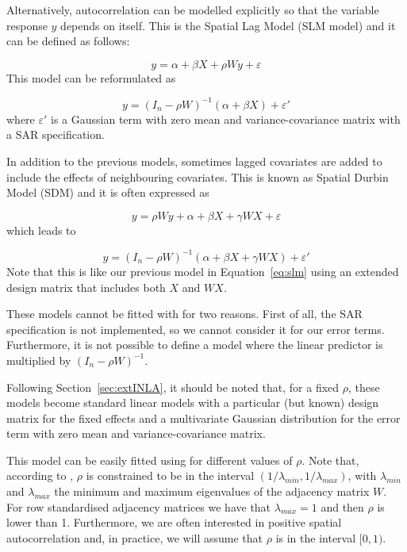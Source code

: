 \documentclass[article]{jss}
\begin{document}
Alternatively, autocorrelation can be modelled explicitly so that the
variable response $y$ depends on itself. This is the Spatial Lag Model
(SLM model) and it can be defined as follows:

\begin{equation}
y= \alpha+\beta X+\rho W y +\varepsilon 
\end{equation}
\noindent
This model can be reformulated as

\begin{equation}
y = (I_n-\rho W)^{-1}(\alpha+\beta X)+\varepsilon' 
\label{eq:slm}
\end{equation}
\noindent
where $\varepsilon'$ is a Gaussian term with zero mean and
variance-covariance matrix with a SAR specification.

In addition to the previous models, sometimes lagged covariates are 
added to include the effects of neighbouring covariates. This is known
as Spatial Durbin Model (SDM)  and it is often expressed as

\begin{equation}
y= \rho W y+ \alpha+\beta X+\gamma W X +\varepsilon 
\end{equation}
\noindent
which leads to

\begin{equation}
y= (I_n-\rho W)^{-1}(\alpha+\beta X+\gamma W X) +\varepsilon'
\end{equation}
\noindent
Note that this is like our previous model in Equation~\ref{eq:slm} using an extended
design matrix that includes both $X$ and $W X$.

These models cannot be fitted with  for two reasons. First of all, 
the SAR specification is not implemented, so we cannot consider it for our
error terms. Furthermore, it is not possible to define a model 
where the linear predictor is multiplied by $(I_n-\rho W)^{-1}$.

Following Section~\ref{sec:extINLA}, it should be noted that, for a fixed
$\rho$, these models become standard linear models with a particular 
(but known) design matrix for the fixed effects and a multivariate Gaussian
distribution for the error term with zero mean and variance-covariance matrix.

This model can be easily fitted using  for different values
of $\rho$. Note that, according to \citet{Haining:2003}, $\rho$ is constrained 
to be in the interval $(1/\lambda_{min}, 1/\lambda_{max})$, with
$\lambda_{min}$ and $\lambda_{max}$ the minimum and maximum eigenvalues of
the adjacency matrix $W$. For row standardised adjacency matrices we have that
$\lambda_{max}=1$ and then $\rho$ is lower than 1. Furthermore, we are often
interested in positive spatial autocorrelation and, in practice, we will
assume that $\rho$ is in the interval $[0,1)$.
\end{document}
